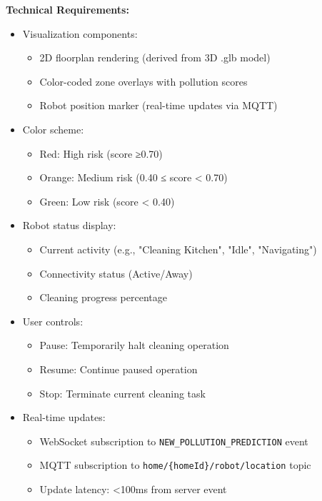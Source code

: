 \documentclass[conference]{IEEEtran}
\begin{document}
\begin{enumerate}
\textbf{Technical Requirements:}
\begin{itemize}
    \item Visualization components:
    \begin{itemize}
        \item 2D floorplan rendering (derived from 3D .glb model)
        \item Color-coded zone overlays with pollution scores
        \item Robot position marker (real-time updates via MQTT)
    \end{itemize}
    \item Color scheme:
    \begin{itemize}
        \item Red: High risk (score ≥0.70)
        \item Orange: Medium risk (0.40 ≤ score < 0.70)
        \item Green: Low risk (score < 0.40)
    \end{itemize}
    \item Robot status display:
    \begin{itemize}
        \item Current activity (e.g., "Cleaning Kitchen", "Idle", "Navigating")
        \item Connectivity status (Active/Away)
        \item Cleaning progress percentage
    \end{itemize}
    \item User controls:
    \begin{itemize}
        \item Pause: Temporarily halt cleaning operation
        \item Resume: Continue paused operation
        \item Stop: Terminate current cleaning task
    \end{itemize}
    \item Real-time updates:
    \begin{itemize}
        \item WebSocket subscription to \texttt{NEW\_POLLUTION\_PREDICTION} event
        \item MQTT subscription to \texttt{home/\{homeId\}/robot/location} topic
        \item Update latency: <100ms from server event
    \end{itemize}
\end{itemize}


\end{enumerate}
\end{document}
